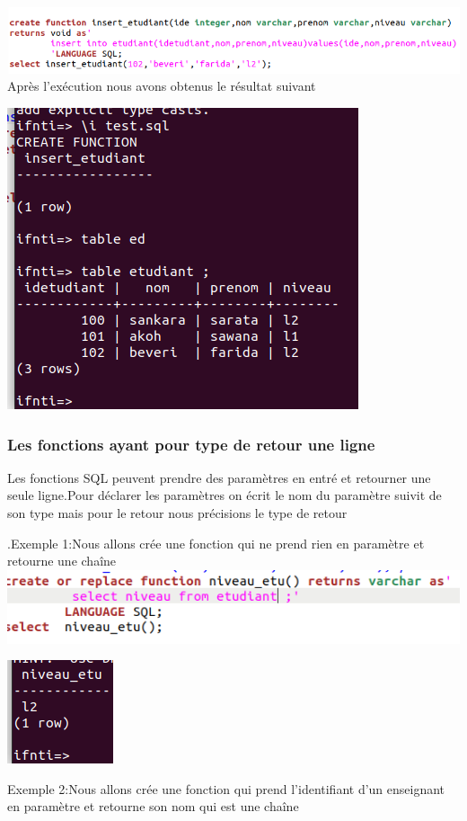 \documentclass[12pt,b5paper]{article}
\begin{document}
\includegraphics[scale=0.5]{fonc}\\

Après l’exécution nous avons obtenus le résultat suivant\\
\begin{center}
\includegraphics[scale=0.5]{insert_etudiant}

\end{center}
\subsubsection{Les fonctions ayant pour type de retour une ligne}
Les fonctions SQL peuvent prendre des paramètres en entré et retourner une seule ligne.Pour déclarer les paramètres on écrit le nom du paramètre suivit de son type mais pour le retour nous précisions le type de retour\newpage

.Exemple 1:Nous allons crée une fonction qui ne prend rien en paramètre et retourne une chaîne\\

\includegraphics[scale=0.5]{var}\\
\begin{center}
\includegraphics[scale=0.6]{res}\\
\end{center}
Exemple 2:Nous allons crée une fonction qui prend l'identifiant d'un enseignant en paramètre et retourne son nom qui est une chaîne\\
\end{document}
